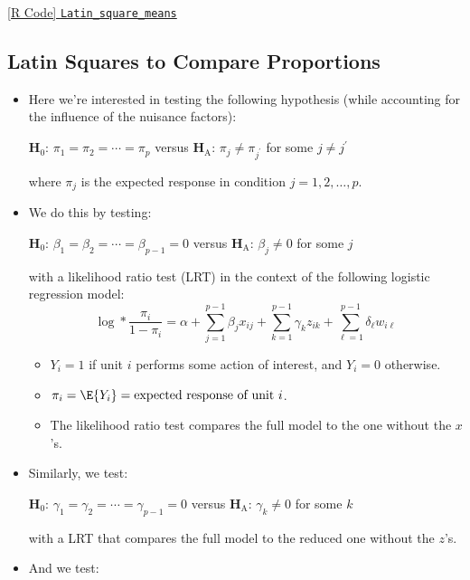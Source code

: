 \href{https://github.com/Hextical/university-notes/blob/master/year-3/semester-3/STAT 430/code/W6/Latin_square_means.R}{[R Code] \texttt{Latin\_square\_means}}
\subsection{Latin Squares to Compare Proportions}
\begin{itemize}
    \item Here we're interested in testing the following hypothesis (while accounting for the influence of the
          nuisance factors):
          \begin{tightcenter}
              $ \mathbf{H}_0 $: $ \pi_1=\pi_2=\cdots=\pi_p $ versus $ \mathbf{H}_\text{A} $: $ \pi_j\ne \pi_{j^\prime }$ for some $ j\ne j^\prime $
          \end{tightcenter}
          where $ \pi_j $ is the expected response in condition $ j=1,2,\ldots,p $.
    \item We do this by testing:
          \begin{tightcenter}
              $ \mathbf{H}_0 $: $ \beta_1=\beta_2=\cdots=\beta_{p-1}=0 $ versus $ \mathbf{H}_\text{A} $: $ \beta_j\ne 0$ for some $ j $
          \end{tightcenter}
          with a likelihood ratio test (LRT) in the context of the following logistic regression model:
          \[ \log*{\frac{\pi_i}{1-\pi_i}}=\alpha+\sum_{j=1}^{p-1} \beta_j x_{ij}+\sum_{k=1}^{p-1} \gamma_k z_{ik}+\sum_{\ell=1}^{p-1} \delta_\ell w_{i\ell} \]
          \begin{itemize}
              \item $ Y_i=1 $ if unit $ i $ performs some action of interest, and $ Y_i=0 $ otherwise.
              \item $ \pi_i=\E{Y_i}=\text{expected response of unit $i$} $.
              \item The likelihood ratio test compares the full model to the one without the $ x $'s.
          \end{itemize}
    \item Similarly, we test:
          \begin{tightcenter}
              $ \mathbf{H}_0 $: $ \gamma_1=\gamma_2=\cdots=\gamma_{p-1}=0 $ versus $ \mathbf{H}_\text{A} $: $ \gamma_k\ne 0$ for some $ k $
          \end{tightcenter}
          with a LRT that compares the full model to the reduced one without the $ z $'s.
    \item And we test:

\end{itemize}
